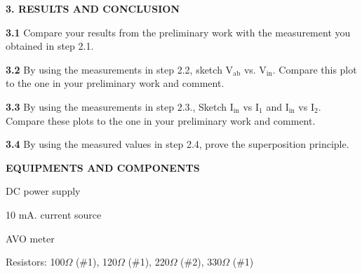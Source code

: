 \documentclass{article}
\begin{document}
\vspace{4mm}

{\Large \textbf{3. RESULTS AND CONCLUSION}}

\vspace{4mm}

{\textbf{3.1} Compare your results from the preliminary work with the measurement you obtained in step 2.1.}

{\textbf{3.2} By using the measurements in step 2.2, sketch V$_\text{ab}$ vs. V$_\text{in}$. Compare this plot to the one in your preliminary work and comment.}

{\textbf{3.3} By using the measurements in step 2.3., Sketch I$_\text{in}$ vs I$_1$ and I$_\text{in}$ vs I$_2$. Compare these plots to the one in your preliminary work and comment.}

{\textbf{3.4} By using the measured values in step 2.4, prove the superposition principle.}

\vspace{4mm}

{\Large \textbf{EQUIPMENTS AND COMPONENTS}}

\vspace{4mm}

{DC power supply}

{10 mA. current source}

{AVO meter}

{Resistors: 100$\Omega$ (\#1), 120$\Omega$ (\#1), 220$\Omega$ (\#2), 330$\Omega$ (\#1)}
\end{document}
